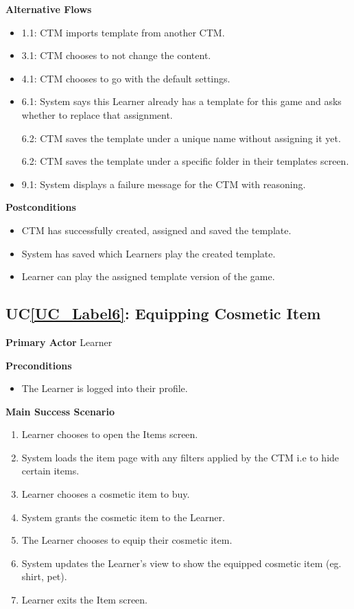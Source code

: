 \documentclass[12pt]{article}
\newcounter{ucnum} %
\newcommand{\ucref}[1]{UC\ref{#1}}
\begin{document}
\textbf{Alternative Flows}
\begin{itemize}
\item 1.1: CTM imports template from another CTM.

\item 3.1: CTM chooses to not change the content.
 
\item 4.1: CTM chooses to go with the default settings.

\item 6.1: System says this Learner already has a template for this game and asks whether to replace that assignment.

6.2: CTM saves the template under a unique name without assigning it yet.

6.2: CTM saves the template under a specific folder in their templates screen.

\item 9.1: System displays a failure message for the CTM with reasoning.

\end{itemize}

\textbf{Postconditions}
\begin{itemize}
\item CTM has successfully created, assigned and saved the template.
\item System has saved which Learners play the created template.
\item Learner can play the assigned template version of the game.
\end{itemize}

 \label{UC_Label6}
\subsection{\ucref{UC_Label6}: Equipping Cosmetic Item}

\textbf{Primary Actor}
Learner

\textbf{Preconditions}
\begin{itemize}
\item The Learner is logged into their profile.
\end{itemize}

\textbf{Main Success Scenario}
\begin{enumerate}
\item Learner chooses to open the Items screen.
\item System loads the item page with any filters applied by the CTM i.e to hide certain items.
\item Learner chooses a cosmetic item to buy.
\item System grants the cosmetic item to the Learner.
\item The Learner chooses to equip their cosmetic item.
\item System updates the Learner's view to show the equipped cosmetic item (eg. shirt, pet).
\item Learner exits the Item screen.
\end{enumerate}
\end{document}
